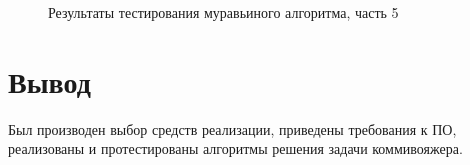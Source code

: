 \clearpage
\begin{figure}[h!]
	
	
	\caption{Результаты тестирования муравьиного алгоритма, часть 5}
	
	\label{fig:x5}
	
\end{figure}





\section*{Вывод}

Был производен выбор средств реализации, приведены требования к ПО, реализованы и протестированы алгоритмы решения задачи коммивояжера.
